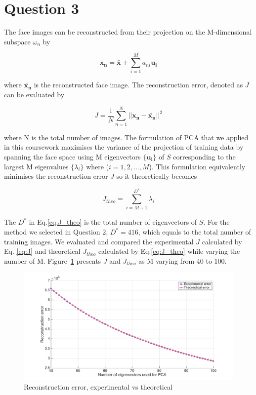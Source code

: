 \documentclass[10pt,twocolumn,letterpaper]{article}
\begin{document}
\section{Question 3}
The face images can be reconstructed from their projection on the M-dimensional subspace $\omega_n$ by

\begin{equation}
	\boldsymbol{\widetilde{x_n}} = \boldsymbol{\bar{x}} + \sum_{i=1}^M a_{ni} \boldsymbol{u_i}
\end{equation}

where $\boldsymbol{\widetilde{x_n}}$ is the reconstructed face image. The reconstruction error, denoted as $J$ can be evaluated by

\begin{equation}
 J = \frac{1}{N} \sum_{n=1}^N || \boldsymbol{x_n} - \boldsymbol{\widetilde{x_n}}||^2
 \label{eq:J}
\end{equation}

where N is the total number of images. The formulation of PCA that we applied in this coursework maximises the variance of the projection of training data by spanning the face space using M eigenvectors $\{ \boldsymbol{u_i} \}$ of $S$ corresponding to the largest M eigenvalues $\{ \lambda_i \}$ where ($i = 1,2,...,M$). This formulation equivalently minimises the reconstruction error $J$ so it theoretically becomes

\begin{equation}
J_{theo} = \sum_{i=M+1}^{D^*} \lambda_i
\label{eq:J_theo}
\end{equation}

The $D^*$ in Eq.\ref{eq:J_theo} is the total number of eigenvectors of $S$. For the method we selected in Question 2, $D^* = 416$, which equals to the total number of training images. We evaluated and compared the experimental $J$ calculated by Eq. \ref{eq:J} and theoretical $J_{theo}$ calculated by Eq.\ref{eq:J_theo} while varying the number of M. Figure~\ref{fig:q3_J} presents $J$ and $J_{theo}$ as M varying from 40 to 100.\\
	
	\begin{figure}
		\begin{center}
			\includegraphics[width=1\linewidth]{q3_J}
			\caption{Reconstruction error, experimental vs theoretical}
			\label{fig:q3_J}
		\end{center}
	\end{figure}
\end{document}
